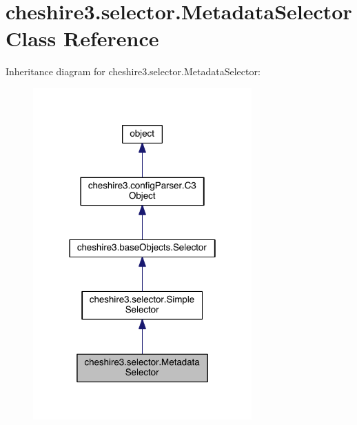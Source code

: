 \hypertarget{classcheshire3_1_1selector_1_1_metadata_selector}{\section{cheshire3.\-selector.\-Metadata\-Selector Class Reference}
\label{classcheshire3_1_1selector_1_1_metadata_selector}
}


Inheritance diagram for cheshire3.\-selector.\-Metadata\-Selector\-:
\nopagebreak
\begin{figure}[H]
\begin{center}
\leavevmode
\includegraphics[width=238pt]{classcheshire3_1_1selector_1_1_metadata_selector__inherit__graph}
\end{center}
\end{figure}


